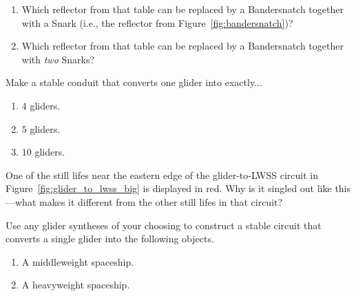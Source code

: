 \begin{multicols}{2}
\begin{problem}
		\begin{enumerate}[label=\bf\color{ocre}(\alph*)]
			\item Which reflector from that table can be replaced by a Bandersnatch together with a Snark (i.e., the reflector from Figure~\ref{fig:bandersnatch})?
			
			\item Which reflector from that table can be replaced by a Bandersnatch together with \emph{two} Snarks?
		\end{enumerate}
	\end{problem}
	
	
	\mfilbreak
	
	
	\begin{problemstar}\label{exer:convert_more_gliders} 
		Make a stable conduit that converts one glider into exactly...\smallskip
		
		\begin{enumerate}[label=\bf\color{ocre}(\alph*)]
			\item $4$ gliders.
			
			\item $5$ gliders.
			
			\item $10$ gliders.
		\end{enumerate}
	\end{problemstar}
	
	
	\mfilbreak
	
	
	\begin{problem}\label{exer:glider_to_lwss_weird_sl} 
		One of the still lifes near the eastern edge of the glider-to-LWSS circuit in Figure~\ref{fig:glider_to_lwss_big} is displayed in red. Why is it singled out like this---what makes it different from the other still lifes in that circuit?
	\end{problem}
	
	
	\mfilbreak
	
	
	\begin{problem}\label{exer:convert_stable_g_to_spaceships}
		Use any glider syntheses of your choosing to construct a stable circuit that converts a single glider into the following objects.\smallskip
		
		\begin{enumerate}[label=\bf\color{ocre}(\alph*)]
			\item {} A middleweight spaceship.
			
			\item {} A heavyweight spaceship.
			

\end{enumerate}
\end{problem}
\end{multicols}
